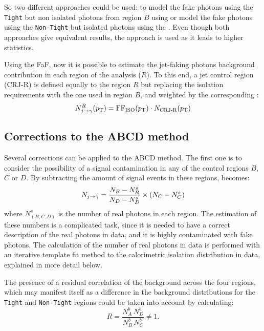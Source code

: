 So two different approaches could be used: to model the fake photons using the \texttt{Tight} but non isolated photons from region \(B\) using \ffiso or model the fake photons using the \texttt{Non-Tight} but isolated photons using the \ffid.
Even though both approaches give equivalent results, the \ffiso approach is used as it leads to higher statistics.

Using the \ac{FaF}, now it is possible to estimate the jet-faking photons background contribution in each region of the analysis (\(R\)). To this end, a jet control region (CRJ-R) is defined equally to the region \(R\) but replacing the isolation requirements with the one used in region \(B\), and weighted by the corresponding \ffiso:
\begin{equation*}
    N^{R}_{j\rightarrow\gamma}(p_{\text{T}}) = \text{FF}_{\text{ISO}}(p_{\text{T}})\cdot N_{\text{CRJ-R}}(p_{\text{T}})
\end{equation*}





\subsection{Corrections to the ABCD method}
\label{subsec:bkg:estimation:abcd_corrections}

Several corrections can be applied to the ABCD method.
The first one is to consider the possibility of a signal contamination in any of the control regions \(B\), \(C\) or \(D\). By subtracting the amount of signal events in these regions, \Eqn{\ref{eq:bkg:estimation:abcd:njfakes}} becomes:
\begin{equation}
    \label{eq:bkg:estimation:abcd_corrections:njfakes_leak}
    N_{j\rightarrow\gamma} = \frac{N_{B} - N_{B}^{s}}{N_{D} - N_{D}^{s}} \times (N_{C} - N_{C}^{s})
\end{equation}
where \(N_{(B,C,D)}^{s}\) is the number of real photons in each region. The estimation of these numbers is a complicated task, since it is needed to have a correct description of the real photons in data, and it is highly contaminated with fake photons. The calculation of the number of real photons in data is performed with an iterative template fit method to the calorimetric isolation distribution in data, explained in more detail below.


The presence of a residual correlation of the background across the four regions, which may manifest itself as a difference in the background distributions for the \texttt{Tight} and \texttt{Non-Tight} regions could be taken into account by calculating:
\begin{equation*}
    R = \frac{N^{b}_{A}\,N^{b}_{D}}{N^{b}_{B}\,N^{b}_{C}} \neq 1.
\end{equation*}

